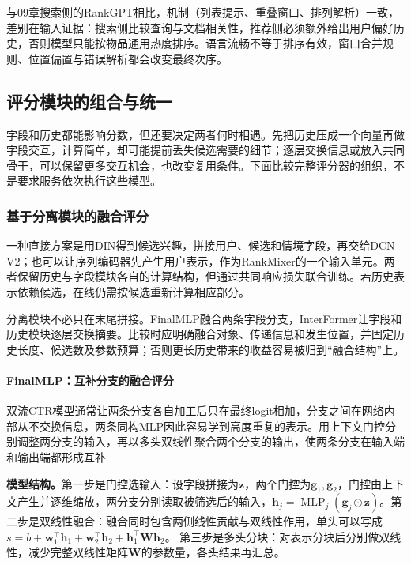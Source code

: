 与09章搜索侧的RankGPT相比，机制（列表提示、重叠窗口、排列解析）一致，差别在输入证据：搜索侧比较查询与文档相关性，推荐侧必须额外给出用户偏好历史，否则模型只能按物品通用热度排序。语言流畅不等于排序有效，窗口合并规则、位置偏置与错误解析都会改变最终次序。

\subsection{评分模块的组合与统一}
\label{sec:rs-scoring-organization}

字段和历史都能影响分数，但还要决定两者何时相遇。先把历史压成一个向量再做字段交互，计算简单，却可能提前丢失候选需要的细节；逐层交换信息或放入共同骨干，可以保留更多交互机会，也改变复用条件。下面比较完整评分器的组织，不是要求服务依次执行这些模型。

\subsubsection{基于分离模块的融合评分}
\label{sec:rs-separate-fusion}

一种直接方案是用DIN得到候选兴趣，拼接用户、候选和情境字段，再交给DCN-V2；也可以让序列编码器先产生用户表示，作为RankMixer的一个输入单元。两者保留历史与字段模块各自的计算结构，但通过共同响应损失联合训练。若历史表示依赖候选，在线仍需按候选重新计算相应部分。

分离模块不必只在末尾拼接。FinalMLP融合两条字段分支，InterFormer让字段和历史模块逐层交换摘要。比较时应明确融合对象、传递信息和发生位置，并固定历史长度、候选数及参数预算；否则更长历史带来的收益容易被归到“融合结构”上。

\Needspace{90mm}
\paragraph{FinalMLP：互补分支的融合评分}
\label{sec:rs-finalmlp}

双流CTR模型通常让两条分支各自加工后只在最终logit相加，分支之间在网络内部从不交换信息，两条同构MLP因此容易学到高度重复的表示。用上下文门控分别调整两分支的输入，再以多头双线性聚合两个分支的输出，使两条分支在输入端和输出端都形成互补

\textbf{模型结构。}第一步是门控选输入：设字段拼接为$\bm z$，两个门控为$\bm g_1,\bm g_2$，门控由上下文产生并逐维缩放，两分支分别读取被筛选后的输入，$\bm h_j=\operatorname{MLP}_j(\bm g_j\odot\bm z)$。第二步是双线性融合：融合同时包含两侧线性贡献与双线性作用，单头可以写成
$s=b+\bm w_1^\top\bm h_1+\bm w_2^\top\bm h_2+\bm h_1^\top\bm W\bm h_2$。
第三步是多头分块：对表示分块后分别做双线性，减少完整双线性矩阵$\bm W$的参数量，各头结果再汇总。


